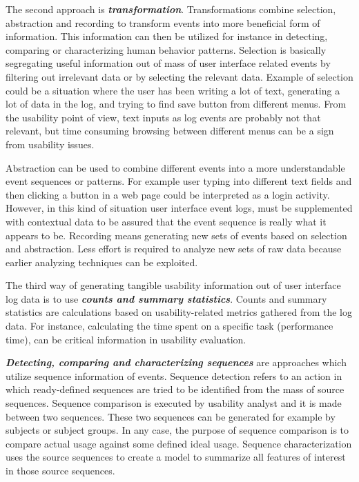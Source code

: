 \documentclass[12pt,a4paper,oneside,pdftex]{report}
\begin{document}
The second approach is \textbf{\emph{transformation}}. Transformations combine selection, abstraction and recording to transform events into more beneficial form of information. This information can then be utilized for instance in detecting, comparing or characterizing human behavior patterns. Selection is basically segregating useful information out of mass of user interface related events by filtering out irrelevant data or by selecting the relevant data. Example of selection could be a situation where the user has been writing a lot of text, generating a lot of data in the log, and trying to find save button from different menus. From the usability point of view, text inputs as log events are probably not that relevant, but time consuming browsing between different menus can be a sign from usability issues. \cite{RefWorks:25}

Abstraction can be used to combine different events into a more understandable event sequences or patterns. For example user typing into different text fields and then clicking a button in a web page could be interpreted as a login activity. However, in this kind of situation user interface event logs, must be supplemented with contextual data to be assured that the event sequence is really what it appears to be. Recording means generating new sets of events based on selection and abstraction. Less effort is required to analyze new sets of raw data because earlier analyzing techniques can be exploited. \cite{RefWorks:25}

The third way of generating tangible usability information out of user interface log data is to use \textbf{\emph{counts and summary statistics}}. Counts and summary statistics are calculations based on usability-related metrics gathered from the log data. For instance, calculating the time spent on a specific task (performance time),  can be critical information in usability evaluation. \cite{RefWorks:24, RefWorks:25}

\textbf{\emph{Detecting, comparing and characterizing sequences}} are approaches which utilize sequence information of events. Sequence detection refers to an action in which ready-defined sequences are tried to be identified from the mass of source sequences. Sequence comparison is  executed by usability analyst and it is made between two sequences. These two sequences can be generated for example by subjects or subject groups. In any case, the purpose of sequence comparison is to compare actual usage against some defined ideal usage. Sequence characterization uses the source sequences to create a model to summarize all features of interest in those source sequences. \cite{RefWorks:24, RefWorks:25}
 
\end{document}

